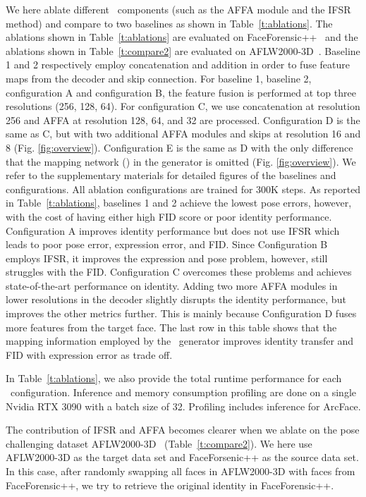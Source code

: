 \documentclass[10pt,twocolumn,letterpaper]{article}
\newcommand{\fti}[1]{\textit{FaceDancer}{#1}}
\begin{document}
We here ablate different \fti~components (such as the AFFA module and the IFSR method) and compare to two baselines as shown in Table~\ref{t:ablations}. The ablations shown in Table~\ref{t:ablations} are evaluated on FaceForensic++~\cite{faceforensics++} and the ablations shown in Table~\ref{t:compare2} are evaluated on AFLW2000-3D~\cite{aflw2000}.
Baseline 1 and 2 respectively employ concatenation and addition in order to fuse feature maps from the decoder and skip connection. 
For baseline 1, baseline 2, configuration A and configuration B, the feature fusion is performed at top three resolutions (256, 128, 64).
For configuration C, we use concatenation at resolution 256 and AFFA at resolution 128, 64, and 32 are processed.
Configuration D is the same as C, but with two additional AFFA modules and skips at resolution 16 and 8 (Fig. \ref{fig:overview}). 
Configuration E is the same as D with the only difference that the mapping network () in the generator is omitted (Fig. \ref{fig:overview}). We refer to the supplementary materials for detailed figures of the baselines and configurations.
All ablation  configurations are trained for 300K steps.
As reported in Table~\ref{t:ablations}, baselines 1 and 2 achieve the lowest pose errors, however, with the cost of having either high FID score or poor identity performance.
Configuration A improves identity performance but does not use IFSR which leads to poor pose error, expression error, and FID. Since Configuration B employs IFSR, it improves the expression and pose problem, however, still struggles with the FID.
Configuration C overcomes these problems and achieves state-of-the-art performance on identity. 
Adding two more AFFA modules in lower resolutions in the decoder slightly disrupts the identity performance, but improves the other metrics further. This is mainly because Configuration D fuses more features from the target face. The last row in this table shows that the mapping information employed by the \fti~generator improves identity transfer and FID with expression error as trade off.
 
In Table~\ref{t:ablations}, we also provide the total runtime performance for each \fti~configuration. Inference and memory consumption profiling are done on a single Nvidia RTX 3090 with a batch size of 32. Profiling includes inference for ArcFace.

The contribution of IFSR and AFFA becomes clearer when we ablate on the pose challenging dataset AFLW2000-3D~\cite{aflw2000} (Table~\ref{t:compare2}). We here use AFLW2000-3D as the target data set and FaceForsenic++ as the source data set.
In this case, after randomly swapping all faces in AFLW2000-3D with faces from FaceForensic++, we try to retrieve the original identity in FaceForensic++. 
\end{document}
